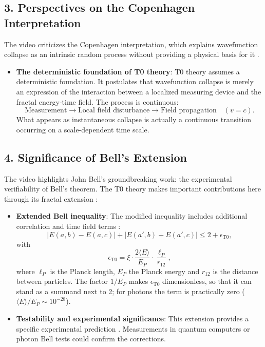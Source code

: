 	\subsection*{3. Perspectives on the Copenhagen Interpretation}
	
	The video criticizes the Copenhagen interpretation, which explains wavefunction collapse as an intrinsic random process without providing a physical basis for it \cite{VideoBell2024}.
	
	\begin{itemize}
		\item \textbf{The deterministic foundation of T0 theory}: T0 theory assumes a deterministic foundation. It postulates that wavefunction collapse is merely an expression of the interaction between a localized measuring device and the fractal energy-time field. The process is continuous:
		\[
		\text{Measurement} \rightarrow \text{Local field disturbance} \rightarrow \text{Field propagation} \quad (v = c).
		\]
		What appears as instantaneous collapse is actually a continuous transition occurring on a scale-dependent time scale.
	\end{itemize}
	
	\subsection*{4. Significance of Bell's Extension}
	
	The video highlights John Bell's groundbreaking work: the experimental verifiability of Bell's theorem. The T0 theory makes important contributions here through its fractal extension \cite{DynMassePhotonenNichtlokalEn, NoGoEn}:
	
	\begin{itemize}
		\item \textbf{Extended Bell inequality}: The modified inequality includes additional correlation and time field terms \cite{DynMassePhotonenNichtlokalEn}:
		\[
		|E(a,b) - E(a,c)| + |E(a',b) + E(a',c)| \leq 2 + \epsilon_{\mathrm{T0}},
		\]
		with
		\[
		\epsilon_{\mathrm{T0}} = \xi \cdot \frac{2\langle E \rangle}{E_P} \cdot \frac{\ell_P}{r_{12}},
		\]
		where $\ell_P$ is the Planck length, $E_P$ the Planck energy and $r_{12}$ is the distance between particles. The factor $1/E_P$ makes $\epsilon_{\mathrm{T0}}$ dimensionless, so that it can stand as a summand next to 2; for photons the term is practically zero ($\langle E \rangle/E_P \sim 10^{-28}$).
		
		\item \textbf{Testability and experimental significance}: This extension provides a specific experimental prediction \cite{023_Bell_En_ch}. Measurements in quantum computers or photon Bell tests could confirm the corrections.
	\end{itemize}
	

